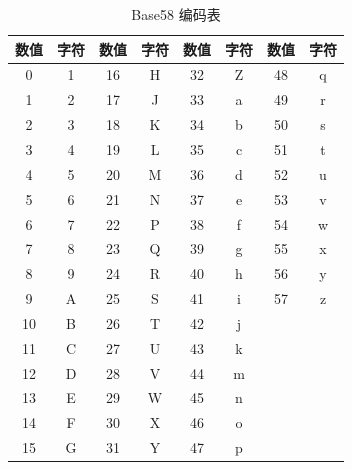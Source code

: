 					\begin{table}[!htb]
					\centering
					\caption{Base58 编码表}
					\label{Base58}
					\begin{tabular}{|c|c|c|c|c|c|c|c|}
					\hline
					数值 & 字符 & 数值 & 字符 & 数值 & 字符 & 数值 & 字符 \\ \hline
					0 & 1 & 16 & H & 32 & Z & 48 & q \\ \hline
					1 & 2 & 17 & J & 33 & a & 49 & r \\ \hline
					2 & 3 & 18 & K & 34 & b & 50 & s \\ \hline
					3 & 4 & 19 & L & 35 & c & 51 & t \\ \hline
					4 & 5 & 20 & M & 36 & d & 52 & u \\ \hline
					5 & 6 & 21 & N & 37 & e & 53 & v \\ \hline
					6 & 7 & 22 & P & 38 & f & 54 & w \\ \hline
					7 & 8 & 23 & Q & 39 & g & 55 & x \\ \hline
					8 & 9 & 24 & R & 40 & h & 56 & y \\ \hline
					9 & A & 25 & S & 41 & i & 57 & z \\ \hline
					10 & B & 26 & T & 42 & j &  &  \\ \hline
					11 & C & 27 & U & 43 & k &  &  \\ \hline
					12 & D & 28 & V & 44 & m &  &  \\ \hline
					13 & E & 29 & W & 45 & n &  &  \\ \hline
					14 & F & 30 & X & 46 & o &  &  \\ \hline
					15 & G & 31 & Y & 47 & p &  &  \\ \hline
					\end{tabular}
					\end{table}

